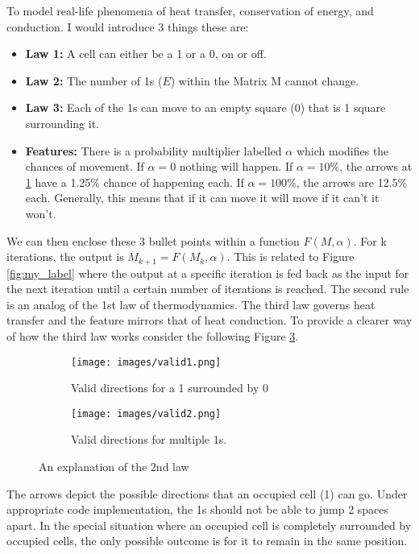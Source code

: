 \vspace{0.3cm}
 To model real-life phenomena of heat transfer, conservation of energy, and conduction. I would introduce 3 things these are:
\begin{itemize}
    \item \textbf{Law 1: }A cell can either be a 1 or a 0, on or off.
    \item \textbf{Law 2: }The number of 1s ($E$) within the Matrix M cannot change.
    \item \textbf{Law 3: }Each of the 1s can move to an empty square (0) that is 1 square surrounding it.
    \item \textbf{Features: }There is a probability multiplier labelled $\alpha$ which modifies the chances of movement. If $\alpha=0$ nothing will happen. If $\alpha=10\%$, the arrows at \ref{fig:directions_1} have a 1.25\% chance of happening each. If $\alpha=100\%$, the arrows are 12.5\% each. Generally, this means that if it can move it will move if it can't it won't. 
\end{itemize}
We can then enclose these 3 bullet points within a function $F(M, \alpha)$. For k iterations, the output is $M_{k+1}=F(M_{k}, \alpha)$. This is related to Figure \ref{fig:my_label} where the output at a specific iteration is fed back as the input for the next iteration until a certain number of iterations is reached. The second rule is an analog of the 1st law of thermodynamics. The third law governs heat transfer and the feature mirrors that of heat conduction. To provide a clearer way of how the third law works consider the following Figure \ref{fig:valid_directions}. 
\begin{figure}[H]
     \centering
     \begin{subfigure}[h]{0.3\textwidth}
         \centering
         \texttt{[image: images/valid1.png]}
         \caption{Valid directions for a 1 surrounded by 0}
         \label{fig:directions_1}
     \end{subfigure}
      \hspace{0.7cm}
     \begin{subfigure}[h]{0.3\textwidth}
         \centering
         \texttt{[image: images/valid2.png]}
         \caption{Valid directions for multiple 1s.}
         \label{fig:directions_2}
     \end{subfigure}
        \caption{An explanation of the 2nd law}
        \label{fig:valid_directions}
\end{figure}
The arrows depict the possible directions that an occupied cell (1) can go. Under appropriate code implementation, the 1s should not be able to jump 2 spaces apart. In the special situation where an occupied cell is completely surrounded by occupied cells, the only possible outcome is for it to remain in the same position. \par
